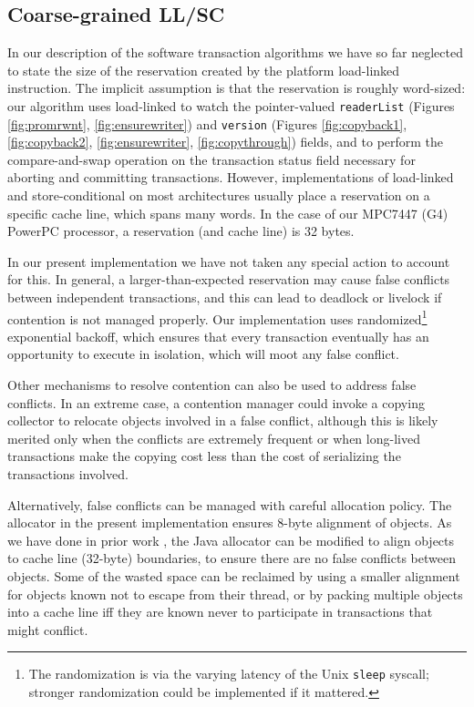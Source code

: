 \subsection{Coarse-grained LL/SC}\label{sec:coarseLL}
In our description of the software transaction algorithms we have so
far neglected to state the size of the reservation created by the
platform load-linked instruction.  The implicit assumption is that the
reservation is roughly word-sized: our algorithm uses load-linked to
watch the pointer-valued \texttt{readerList}
(Figures \ref{fig:promrwnt}, \ref{fig:ensurewriter}) and
\texttt{version} (Figures \ref{fig:copyback1}, \ref{fig:copyback2},
\ref{fig:ensurewriter},
\ref{fig:copythrough}) fields, and to perform the compare-and-swap
operation on the transaction status field necessary for aborting and
committing transactions.  However, implementations of load-linked and
store-conditional on most architectures usually place a reservation on
a specific cache line, which spans many words.  In the case of our
MPC7447 (G4) PowerPC processor, a reservation (and cache line) is 32
bytes.

In our present implementation we have not taken any special action to
account for this.  In general, a larger-than-expected reservation may
cause false conflicts between independent transactions, and this can
lead to deadlock or livelock if contention is not managed properly.
Our implementation uses randomized\footnote{The randomization is via
  the varying latency of the Unix \texttt{sleep} syscall; stronger
  randomization could be implemented if it mattered.}
 exponential backoff, which ensures that every transaction
 eventually has an opportunity to execute in isolation, which will
 moot any false conflict.

Other mechanisms to resolve contention can also be used to address
false conflicts.  In an extreme case, a contention manager could
invoke a copying collector to relocate objects involved in a false
conflict, although this is likely merited only when the conflicts are
extremely frequent or when long-lived transactions make the
copying cost less than the cost of serializing the transactions involved.

Alternatively, false conflicts can be managed with careful allocation
policy.  The allocator in the present implementation ensures 8-byte
alignment of objects.  As we have done in prior work
\cite{WitchelLaAnAs01}, the Java allocator can be modified to align
objects to cache line (32-byte) boundaries, to ensure there are no
false conflicts between objects.  Some of the wasted space can be
reclaimed by using a smaller alignment for objects known not to escape
from their thread, or by packing multiple objects into a cache line
iff they are known never to participate in transactions that might
conflict.


